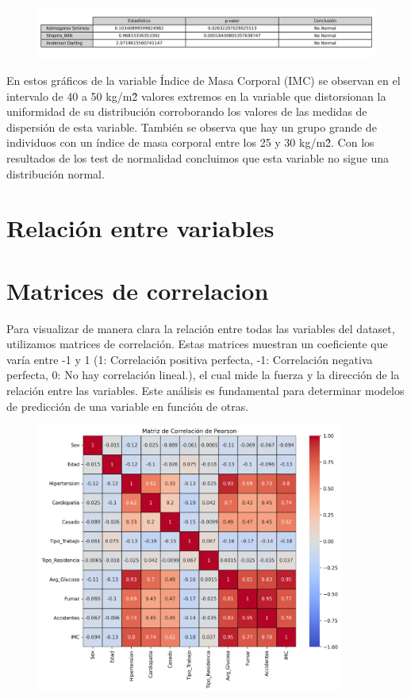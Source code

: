 \documentclass[a4paper, 12pt]{article}
\begin{document}
\begin{figure}[H]
    \centering
    \includegraphics[width=1\textwidth]{img/Tablas/test_normalidad_IMC.png}
\end{figure}


En estos gráficos de la variable Índice de Masa Corporal (IMC) se observan en el intervalo de 40 a 50 kg/m\^2 valores extremos en 
la variable que distorsionan la uniformidad de su distribución corroborando los valores de las medidas de dispersión de esta variable. 
También se observa que hay un grupo grande de individuos con un índice de masa corporal entre los 25 y 30 kg/m\^2. Con los resultados 
de los test de normalidad concluimos que esta variable no sigue una distribución normal.









\newpage


\section{Relación entre variables}

\section{Matrices de correlacion}
Para visualizar de manera clara la relación entre todas las variables del dataset, utilizamos matrices de correlación. Estas matrices muestran un coeficiente que varía entre -1 y 1 (1: Correlación positiva perfecta, -1: Correlación negativa perfecta, 0: No hay correlación lineal.), el cual mide la fuerza y la dirección de la relación entre las variables. Este análisis es fundamental para determinar modelos de predicción de una variable en función de otras.
\begin{figure}[h]
    \centering
    \includegraphics[width=0.9\textwidth]{img/matriz_correlacion_pearson.png}
\end{figure}
\end{document}
